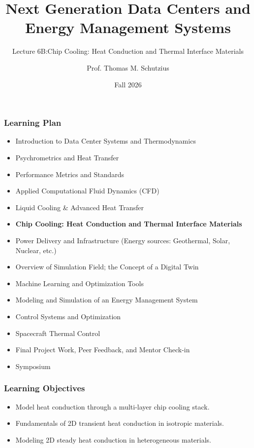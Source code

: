 \documentclass[aspectratio=169,10pt,xcolor={table,dvipsnames},t]{beamer}
\title[lecture 06]{Next Generation Data Centers and Energy Management Systems}
\subtitle{Lecture 6B:Chip Cooling: Heat Conduction and Thermal Interface Materials}
\author{Prof. Thomas M. Schutzius}
\institute{Department of Mechanical Engineering}
\date{Fall 2026}
\begin{document}
\begin{frame}
  \titlepage
\end{frame}


{
\smallframetitle %

\begin{frame}
	\frametitle{Learning Plan}
	\begin{itemize}
		\item Introduction to Data Center Systems and Thermodynamics 
		\item Psychrometrics and Heat Transfer
		\item Performance Metrics and Standards
		\item Applied Computational Fluid Dynamics (CFD)
		\item Liquid Cooling \& Advanced Heat Transfer
		\item \textbf{Chip Cooling: Heat Conduction and Thermal Interface Materials}
		\item Power Delivery and Infrastructure (Energy sources: Geothermal, Solar, Nuclear, etc.)
		\item Overview of Simulation Field; the Concept of a Digital Twin 
		\item Machine Learning and Optimization Tools 
		\item Modeling and Simulation of an Energy Management System 
		\item Control Systems and Optimization 
		\item Spacecraft Thermal Control
		\item Final Project Work, Peer Feedback, and Mentor Check-in 
		\item Symposium 
	\end{itemize}		
\end{frame}

\begin{frame}
	\frametitle{Learning Objectives} 
		\begin{itemize}
			\item Model heat conduction through a multi-layer chip cooling stack.
			\item Fundamentals of 2D transient heat conduction in isotropic materials.
			\item Modeling 2D steady heat conduction in heterogeneous materials.
		\end{itemize}		
\end{frame}


}
\end{document}
